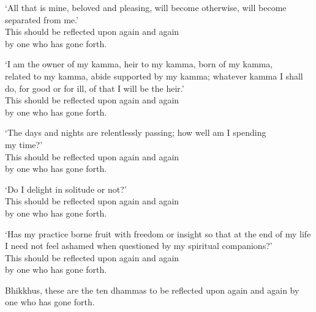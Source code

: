 `All that is mine, beloved and pleasing, will become otherwise, will become separated from me.'\\
This should be reflected upon again and again\\
by one who has gone forth.

`I am the owner of my kamma, heir to my kamma, born of my kamma,\\
related to my kamma, abide supported by my kamma; whatever kamma I shall do, for good or for ill, of that I will be the heir.'\\
This should be reflected upon again and again\\
by one who has gone forth.

`The days and nights are relentlessly passing; how well am I spending\\ my time?'\\
This should be reflected upon again and again\\
by one who has gone forth.

`Do I delight in solitude or not?'\\
This should be reflected upon again and again\\
by one who has gone forth.

`Has my practice borne fruit with freedom or insight so that at the end of my life I need not feel ashamed when questioned by my spiritual companions?'\\
This should be reflected upon again and again\\
by one who has gone forth.

Bhikkhus, these are the ten dhammas to be reflected upon again and again by one who has gone forth.


